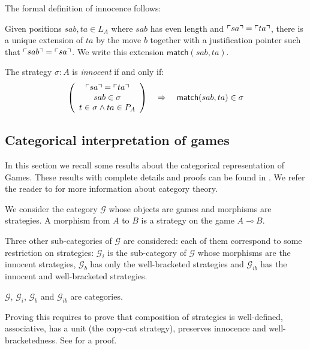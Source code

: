 The formal definition of innocence follows:
\begin{dfn}[Innocence]
Given positions $sab, ta \in L_A$ where $sab$ has even length and
$\ulcorner sa \urcorner = \ulcorner ta \urcorner$, there is a unique extension of $ta$ by
the move $b$ together with a justification pointer such that
$\ulcorner sab \urcorner = \ulcorner sa \urcorner$. We write this extension
$\textsf{match}(sab,ta)$.

The strategy $\sigma:A$ is \emph{innocent} if and only if:
$$ \left(
     \begin{array}{c}
       \ulcorner sa \urcorner = \ulcorner ta \urcorner \\
       sab \in \sigma \\
       t\in \sigma \wedge ta \in P_A \\
     \end{array}
   \right)
\quad \Rightarrow\quad  \textsf{match}(sab,ta) \in \sigma$$

\end{dfn}


\subsection{Categorical interpretation of games}

In this section we recall some results about the categorical representation of Games.
These results with complete details and proofs can be found in \cite{McC96b,hylandong_pcf,abramsky94full}.
We refer the reader to \cite{CroleRL:catt} for more information about category theory.

We consider the category $\mathcal{G}$ whose objects are games and morphisms are
strategies. A morphism from $A$ to $B$ is a strategy on the game $A \multimap B$.

Three other sub-categories of $\mathcal{G}$ are considered: each of them correspond to some restriction on strategies:
$\mathcal{G}_i$ is the sub-category
of $\mathcal{G}$ whose morphisms are the innocent strategies,
$\mathcal{G}_b$ has only the well-bracketed strategies and $\mathcal{G}_{ib}$ has the innocent and well-bracketed strategies.

\begin{prop}
$\mathcal{G}$, $\mathcal{G}_i$, $\mathcal{G}_b$ and $\mathcal{G}_{ib}$ are categories.
\end{prop}

Proving this requires to prove that composition of strategies is well-defined, associative, has a unit (the copy-cat strategy), preserves innocence and
well-bracketedness. See \cite{hylandong_pcf,abramsky94full} for a proof.


